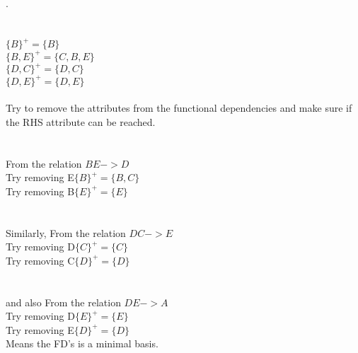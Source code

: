 . \\ \\ \\
$\{B\}^+ = \{ B\}$ \\
$\{B,E\}^+ = \{ C,B,E\}$ \\
$\{D,C\}^+ = \{ D,C\}$ \\
$\{D,E\}^+ = \{ D,E\}$ \\ \\

Try to remove the attributes from the functional dependencies and make sure if the RHS attribute can be reached. \\ \\ \\

From the relation $BE -> D$\\
Try removing E$\{B\}^+ = \{B,C\}$ \\
Try removing B$\{E\}^+ = \{ E\}$ \\ \\ \\
Similarly, From the relation $DC -> E$\\
Try removing D$\{C\}^+ = \{C\}$ \\
Try removing C$\{D\}^+ = \{ D\}$ \\ \\ \\

and also From the relation $DE -> A$\\
Try removing D$\{E\}^+ = \{E\}$ \\
Try removing E$\{D\}^+ = \{D\}$ \\

Means the FD's is a minimal basis.
